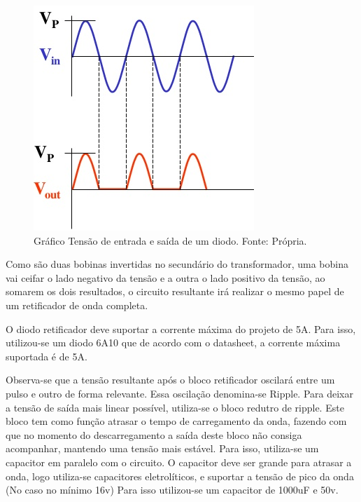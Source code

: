                 \begin{figure}[!htb]
            		\centering
            		\includegraphics[scale= 0.5]{figuras/Retificador.png}
            		\caption{Gráfico Tensão de entrada e saída de um diodo. Fonte: Própria.}
            		\label{retificador}
            	\end{figure}		
            	
            	Como são duas bobinas invertidas no secundário do transformador, uma bobina 					vai ceifar o lado negativo da tensão e a outra o lado positivo da tensão, ao 					somarem os dois resultados, o circuito resultante irá realizar o mesmo papel 					de um retificador de onda completa.
            	
				O diodo retificador deve suportar a corrente máxima do projeto de 5A. Para 						isso, utilizou-se um diodo 6A10 que de acordo com o datasheet, a corrente 						máxima suportada é de 5A.
				
				Observa-se que a tensão resultante após o bloco retificador oscilará entre um 					pulso e outro de forma relevante. Essa oscilação denomina-se Ripple. Para 						deixar a tensão de saída mais linear possível, utiliza-se o bloco redutro de 					ripple. Este bloco  tem como função atrasar o tempo de carregamento da onda, 					fazendo com que no momento do descarregamento a saída deste bloco não consiga 					acompanhar, mantendo uma tensão mais estável. Para isso, utiliza-se um 							capacitor em paralelo com o circuito. O capacitor deve ser grande para atrasar 				a onda, logo utiliza-se capacitores eletrolíticos, e suportar a tensão de pico 				da onda (No caso no mínimo 16v) Para isso utilizou-se um capacitor de 1000uF e 				50v.

